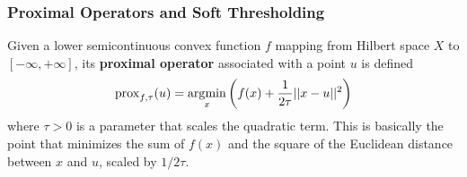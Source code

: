   \subsubsection{Proximal Operators and Soft Thresholding}

    \begin{definition}
      Given a lower semicontinuous convex function $f$ mapping from Hilbert space $X$ to $[-\infty, +\infty]$, its \textbf{proximal operator} associated with a point $u$ is defined 
      \begin{equation}
        \prox_{f, \tau} (u) = \argmin_{x} \bigg( f(x) + \frac{1}{2\tau} ||x - u||^2 \bigg)
      \end{equation}
      where $\tau > 0$ is a parameter that scales the quadratic term. This is basically the point that minimizes the sum of $f(x)$ and the square of the Euclidean distance between $x$ and $u$, scaled by $1/2\tau$. 
    \end{definition}


